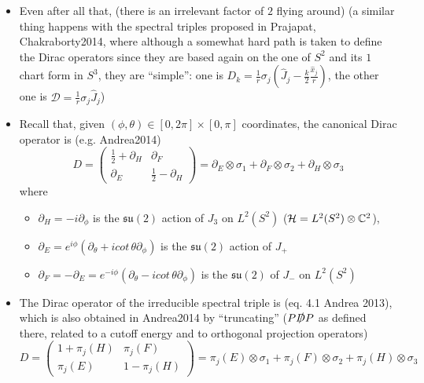 \documentclass{article}
\newcommand{\sut}{\ensuremath{\mathfrak{su}(2)}}
\begin{document}
\begin{itemize}
\begin{itemize}
        \item Even after all that,  (there is an irrelevant factor of $2$ flying around) (a similar thing happens with the spectral triples proposed in Prajapat, Chakraborty2014, where although a somewhat hard path is taken to define the Dirac operators since they are based again on the one of $S^2$ and its $1$ chart form in $S^3$, they are ``simple'': one is $D_k = \frac{1}{r}\sigma_j (\hat J_j - \frac{k}{2}\frac{\hat x_j}{r})$, the other one is $\mathcal D = \frac{1}{r} \sigma_j \hat J_j$)
        
        \item Recall that, given $(\phi, \theta) \in [0, 2\pi]\times [0, \pi]$ coordinates, the canonical Dirac operator is (e.g. Andrea2014)
        \begin{equation}
            D = \begin{pmatrix} \frac{1}{2} + \partial_H & \partial_F \\ \partial_E & \frac{1}{2} - \partial_H\end{pmatrix} = \partial_E \otimes \sigma_1 + \partial_F \otimes \sigma_2 + \partial_H \otimes \sigma_3
        \end{equation}
        where 
            \begin{itemize}
            
            \item $\partial_H = -i \partial_\phi$ is the $\sut$ action of $J_3$ on $L^2(S^2)$ ($\mathcal H = L^2(S^2) \otimes \mathbb{C}^2$),
            
            \item $\partial_E = e^{i\phi} \left( \partial_\theta + i cot\,\theta \partial_\phi \right)$ is the $\sut$ action of $J_+$
            
            \item $\partial_F = -\partial_E = e^{-i\phi} \left( \partial_\theta - i cot\,\theta \partial_\phi \right)$ is the $\sut$ of $J_-$ on $L^2(S^2)$
            
            \end{itemize}  
        
        \item The Dirac operator of the irreducible spectral triple is (eq. 4.1 Andrea 2013), which is also obtained in Andrea2014 by ``truncating'' ($P\slashed D P$ as defined there, related to a cutoff energy and to orthogonal projection operators)
        \begin{equation}
            D = \begin{pmatrix} 1 + \pi_j(H) & \pi_j(F) \\ \pi_j(E) & 1 - \pi_j(H)\end{pmatrix} = \pi_j(E) \otimes \sigma_1 + \pi_j(F) \otimes \sigma_2 + \pi_j(H) \otimes \sigma_3
        \end{equation}
        

\end{itemize}
\end{itemize}
\end{document}

